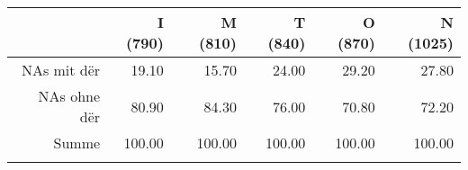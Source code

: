 \begin{tabular}{rrrrrr}
  \lsptoprule
 & I (790) & M (810) & T (840) & O (870) & N (1025) \\ 
  \midrule
NAs mit dër & 19.10 & 15.70 & 24.00 & 29.20 & 27.80 \\ 
  NAs ohne dër & 80.90 & 84.30 & 76.00 & 70.80 & 72.20 \\ 
  Summe & 100.00 & 100.00 & 100.00 & 100.00 & 100.00 \\ 
   \lspbottomrule
\end{tabular}
